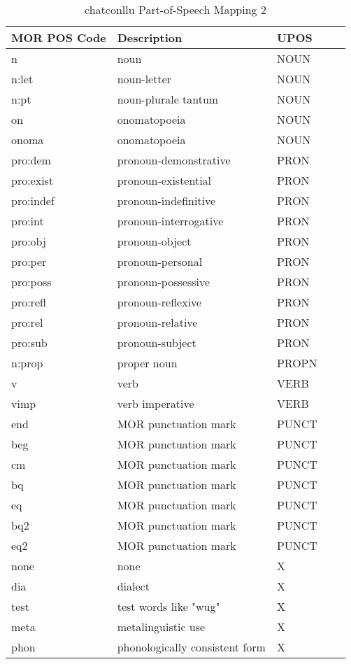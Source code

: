 \newpage
\vspace{-2cm}
\begin{table}[h!]
\caption {chatconllu Part-of-Speech Mapping 2} \label{tab:posmap2}
\begin{tabular}{@{}lllll@{}}
\toprule
\textbf{MOR POS Code} & \textbf{Description} & \textbf{UPOS}\\ \midrule
n & noun & NOUN\\
n:let & noun-letter & NOUN\\
n:pt & noun-plurale tantum & NOUN\\
on & onomatopoeia & NOUN\\
onoma & onomatopoeia & NOUN\\\midrule
pro:dem & pronoun-demonstrative & PRON\\
pro:exist & pronoun-existential & PRON\\
pro:indef & pronoun-indefinitive & PRON\\
pro:int & pronoun-interrogative & PRON\\
pro:obj & pronoun-object & PRON\\
pro:per & pronoun-personal & PRON\\
pro:poss & pronoun-possessive & PRON\\
pro:refl & pronoun-reflexive & PRON\\
pro:rel & pronoun-relative & PRON\\
pro:sub & pronoun-subject & PRON\\\midrule
n:prop & proper noun & PROPN\\\midrule
v & verb & VERB\\
vimp & verb imperative & VERB\\\midrule
end & MOR punctuation mark & PUNCT\\
beg & MOR punctuation mark & PUNCT\\
cm & MOR punctuation mark & PUNCT\\
bq & MOR punctuation mark & PUNCT\\
eq & MOR punctuation mark & PUNCT\\
bq2 & MOR punctuation mark & PUNCT\\
eq2 & MOR punctuation mark & PUNCT\\\midrule
none & none & X\\
dia & dialect & X\\
test & test words like "wug" & X\\
meta & metalinguistic use & X\\
phon & phonologically consistent form & X\\

\end{tabular}
\end{table}
